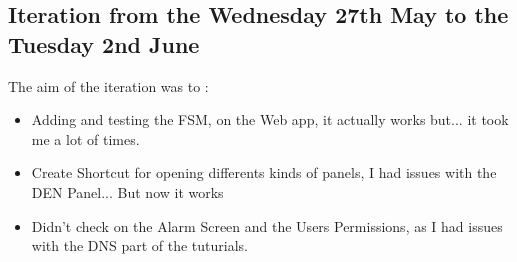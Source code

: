\documentclass[a4paper, 12pt]{article}
\begin{document}
\subsection{Iteration from the Wednesday 27th May to the Tuesday 2nd June}
The aim of the iteration was to :
\begin{itemize}
    \item Adding and testing the FSM, on the Web app, it actually works but... it took me a lot of times.
    \item Create Shortcut for opening differents kinds of panels, I had issues with the DEN Panel... But now it works
    \item Didn't check on the Alarm Screen and the Users Permissions, as I had issues with the DNS part of the tuturials.
\end{itemize}
\end{document}
